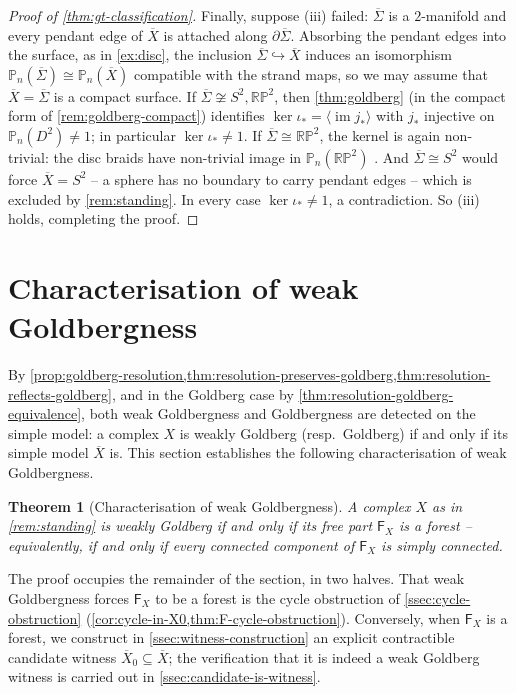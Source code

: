 \documentclass[reqno]{amsart}
\newtheorem{theorem}{Theorem}[section]
\theoremstyle{definition}
\newcommand{\PB}{\mathbb{P}}
\newcommand{\im}{\operatorname{im}}
\newcommand{\RP}{\mathbb{RP}}
\newcommand{\co}[1]{\mathopen{\langle}#1\mathclose{\rangle}} %
\renewcommand{\bar}{\overline}
\numberwithin{equation}{section}
\begin{document}
\begin{proof}[Proof of \cref{thm:gt-classification}]
Finally, suppose (iii) failed: \(\bar\Sigma\) is a
\(2\)-manifold and every pendant edge of \(\bar X\) is attached
along \(\partial\bar\Sigma\). Absorbing the pendant edges into
the surface, as in \cref{ex:disc}, the inclusion
\(\bar\Sigma\hookrightarrow\bar X\) induces an isomorphism
\(\PB_n(\bar\Sigma)\cong\PB_n(\bar X)\) compatible with the
strand maps, so we may assume that \(\bar X=\bar\Sigma\) is a
compact surface. If \(\bar\Sigma\not\cong S^2,\RP^2\), then
\cref{thm:goldberg} (in the compact form of
\cref{rem:goldberg-compact}) identifies
\(\ker\iota_\ast=\co{\im j_\ast}\) with \(j_\ast\) injective on
\(\PB_n(D^2)\neq1\); in particular \(\ker\iota_\ast\neq1\). If
\(\bar\Sigma\cong\RP^2\), the kernel is again non-trivial: the
disc braids have non-trivial image in \(\PB_n(\RP^2)\)
\cite{VanBuskirk1966}. And \(\bar\Sigma\cong S^2\) would force
\(\bar X=S^2\) -- a sphere has no boundary to carry pendant
edges -- which is excluded by \cref{rem:standing}. In every case
\(\ker\iota_\ast\neq1\), a contradiction. So (iii) holds,
completing the proof.
\end{proof}


\section{Characterisation of weak Goldbergness}
\label{sec:simple-model-necessity}

By
\cref{prop:goldberg-resolution,thm:resolution-preserves-goldberg,thm:resolution-reflects-goldberg},
and in the Goldberg case by
\cref{thm:resolution-goldberg-equivalence}, both weak Goldbergness
and Goldbergness are detected on the simple model: a complex
\(X\) is weakly Goldberg (resp.\ Goldberg) if and only if its
simple model \(\bar X\) is. This section establishes the
following characterisation of weak Goldbergness.

\begin{theorem}[Characterisation of weak Goldbergness]
\label{thm:weak-goldberg-char}
A complex \(X\) as in \cref{rem:standing} is weakly Goldberg if
and only if its free part \(\mathsf{F}_{X}\) is a forest --
equivalently, if and only if every connected component of
\(\mathsf{F}_{X}\) is simply connected.
\end{theorem}

The proof occupies the remainder of the section, in two halves.
That weak Goldbergness forces \(\mathsf{F}_{X}\) to be a forest
is the cycle obstruction of \cref{ssec:cycle-obstruction}
(\cref{cor:cycle-in-X0,thm:F-cycle-obstruction}). Conversely, when
\(\mathsf{F}_{X}\) is a forest, we construct in
\cref{ssec:witness-construction} an explicit contractible
candidate witness \(\bar X_0\subseteq\bar X\); the verification
that it is indeed a weak Goldberg witness is carried out in
\cref{ssec:candidate-is-witness}.
\end{document}
